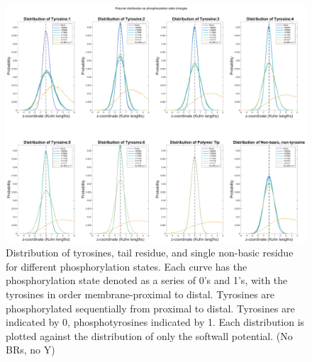 \documentclass[../../AdvancementSummary.tex]{subfiles}
\begin{document}
\begin{figure}[H]
\begin{center}
\includegraphics[width=\linewidth]{ResultsFigures/CD3ZetaSoftwallPiecewiseBasicsY/Phosphorylation/iSiteDistribution123456.eps}
\end{center}
\caption{Distribution of tyrosines, tail residue, and single non-basic residue for different phosphorylation states. Each curve has the phosphorylation state denoted as a series of 0's and 1's, with the tyrosines in order membrane-proximal to distal. Tyrosines are phosphorylated sequentially from proximal to distal. Tyrosines are indicated by 0, phosphotyrosines indicated by 1. Each distribution is plotted against the distribution of only the softwall potential. (No BRs, no Y) \label{fig: Dist123456}}
\end{figure}
\end{document}
